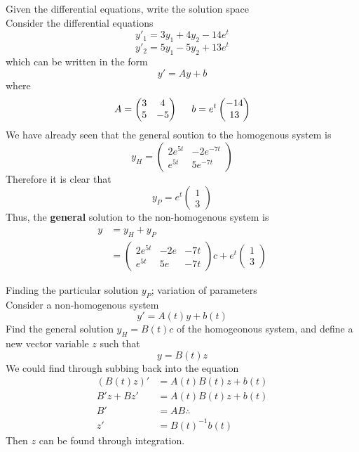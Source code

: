 \documentclass[journal, letterpaper]{IEEEtran}
\begin{document}
    \begin{myboxg}{Given the differential equations, write the solution space} \\ 
        Consider the differential equations
        $$ y'_1 = 3y_1 + 4y_2 - 14e^t$$
        $$ y'_2 = 5y_1 - 5y_2 + 13e^t$$
        which can be written in the form
        $$ y' = Ay + b$$
        where
        $$ A = \begin{pmatrix}
            3 & 4 \\ 5 & -5
        \end{pmatrix} \hspace{0.5cm} b = e^{t}\begin{pmatrix}
            -14 \\ 13
        \end{pmatrix}$$
        We have already seen that the general soution to the homogenous system is
        $$ y_H = \begin{pmatrix}
            2e^{5t} & -2e^{-7t} \\ 
            e^{5t} & 5e^{-7t}
        \end{pmatrix}$$
        Therefore it is clear that
        $$ y_P = e^t\begin{pmatrix}
            1 \\ 3
        \end{pmatrix}$$
        Thus, the \textbf{general} solution to the non-homogenous system is
        \begin{align*}
        y &= y_H + y_P \\ 
        &= \begin{pmatrix}
            2e^{5t} & -2e&{-7t} \\
            e^{5t} & 5e&{-7t}
        \end{pmatrix}c + e^{t}\begin{pmatrix}
            1 \\ 3
        \end{pmatrix}
        \end{align*}
    \end{myboxg}
    \begin{mybox}{Finding the particular solution $y_P$; variation of parameters} \\ 
        Consider a non-homogenous system
        $$ y' = A(t)y + b(t)$$
        Find the general solution $y_H = B(t)c$ of the homogeonous system, and define a new vector variable $z$ such that
        $$ y = B(t)z$$
        We could find through subbing back into the equation
        \begin{align*}
            (B(t)z)' &= A(t)B(t)z + b(t) \\
            B'z + Bz' &= A(t)B(t)z + b(t) \\ 
            B' &= AB \therefore \\
            z' &= B(t)^{-1}b(t)
        \end{align*}
        Then $z$ can be found through integration.
    \end{mybox}
\end{document}

